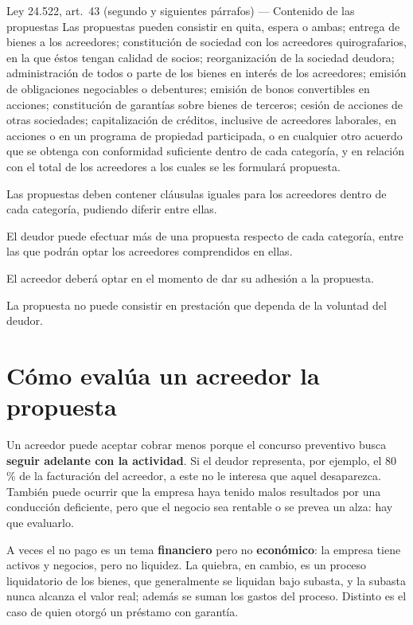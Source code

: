 \documentclass[12pt,oneside]{book}
\begin{document}
\begin{norma}{Ley 24.522, art.\ 43 (segundo y siguientes párrafos) --- Contenido de las propuestas}
Las propuestas pueden consistir en quita, espera o ambas; entrega de bienes a los acreedores; constitución de sociedad con los acreedores quirografarios, en la que éstos tengan calidad de socios; reorganización de la sociedad deudora; administración de todos o parte de los bienes en interés de los acreedores; emisión de obligaciones negociables o debentures; emisión de bonos convertibles en acciones; constitución de garantías sobre bienes de terceros; cesión de acciones de otras sociedades; capitalización de créditos, inclusive de acreedores laborales, en acciones o en un programa de propiedad participada, o en cualquier otro acuerdo que se obtenga con conformidad suficiente dentro de cada categoría, y en relación con el total de los acreedores a los cuales se les formulará propuesta.

Las propuestas deben contener cláusulas iguales para los acreedores dentro de cada categoría, pudiendo diferir entre ellas.

El deudor puede efectuar más de una propuesta respecto de cada categoría, entre las que podrán optar los acreedores comprendidos en ellas.

El acreedor deberá optar en el momento de dar su adhesión a la propuesta.

La propuesta no puede consistir en prestación que dependa de la voluntad del deudor.
\end{norma}

\section{Cómo evalúa un acreedor la propuesta}

Un acreedor puede aceptar cobrar menos porque el concurso preventivo busca \textbf{seguir adelante con la actividad}. Si el deudor representa, por ejemplo, el 80\,\% de la facturación del acreedor, a este no le interesa que aquel desaparezca. También puede ocurrir que la empresa haya tenido malos resultados por una conducción deficiente, pero que el negocio sea rentable o se prevea un alza: hay que evaluarlo.

A veces el no pago es un tema \textbf{financiero} pero no \textbf{económico}: la empresa tiene activos y negocios, pero no liquidez. La quiebra, en cambio, es un proceso liquidatorio de los bienes, que generalmente se liquidan bajo subasta, y la subasta nunca alcanza el valor real; además se suman los gastos del proceso. Distinto es el caso de quien otorgó un préstamo con garantía.
\end{document}
